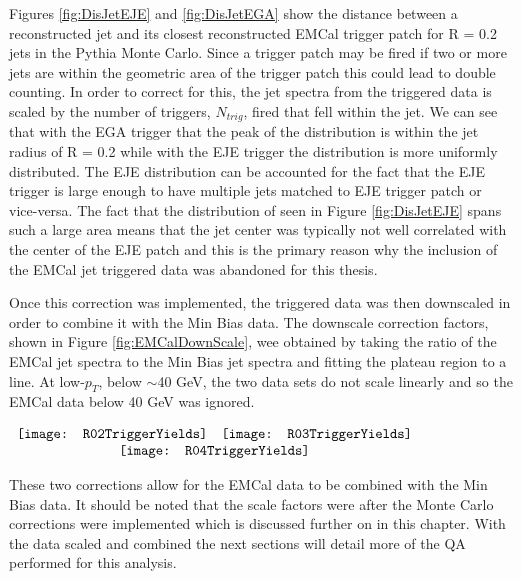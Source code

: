 \noindent
Figures \ref{fig:DisJetEJE} and \ref{fig:DisJetEGA} show the distance between a reconstructed jet and its closest reconstructed EMCal trigger patch for R = 0.2 jets in the Pythia Monte Carlo.  Since a trigger patch may be fired if two or more jets are within the geometric area of the trigger patch this could lead to double counting.  In order to correct for this, the jet spectra from the triggered data is scaled by the number of triggers, $N_{trig}$, fired that fell within the jet.  We can see that with the EGA trigger that the peak of the distribution is within the jet radius of R = 0.2 while with the EJE trigger the distribution is more uniformly distributed.  The EJE distribution can be accounted for the fact that the EJE trigger is large enough to have multiple jets matched to EJE trigger patch or vice-versa.  The fact that the distribution of seen in Figure \ref{fig:DisJetEJE} spans such a large area means that the jet center was typically not well correlated with the center of the EJE patch and this is the primary reason why the inclusion of the EMCal jet triggered data was abandoned for this thesis.

Once this correction was implemented, the triggered data was then downscaled in order to combine it with the Min Bias data.  The downscale correction factors, shown in Figure \ref{fig:EMCalDownScale}, wee obtained by taking the ratio of the EMCal jet spectra to the Min Bias jet spectra and fitting the plateau region to a line.  At low-$p_{T}$, below $\sim$40 GeV,  the two data sets do not scale linearly and so the EMCal data below 40 GeV was ignored.


\begin{figure*}[t!]
$\begin{array}{rl}
    \texttt{[image: R02TriggerYields]} &
    \texttt{[image: R03TriggerYields]}\\
    \multicolumn{2}{c}{\texttt{[image: R04TriggerYields]}}
\end{array}$
\caption[EMCal triggered data correction factors for R=0.2, R=0.3, and R=0.4 jets.]{\label{fig:EMCalDownScale}EMCal triggered data correction factors for R=0.2, R=0.3, and R=0.4 jets.}
\end{figure*}

These two corrections allow for the EMCal data to be combined with the Min Bias data.  It should be noted that the scale factors were after the Monte Carlo corrections were implemented which is discussed further on in this chapter.  With the data scaled and combined the next sections will detail more of the QA performed for this analysis.

